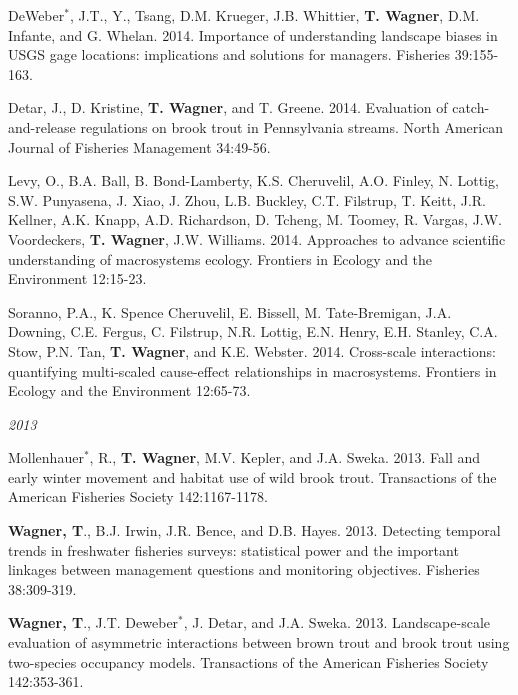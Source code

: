 \documentclass[10pt]{article}
\begin{document}
\begin{flushleft}
\begin{etaremune}[start=41]
\item DeWeber$^*$, J.T., Y., Tsang, D.M. Krueger, J.B. Whittier, {\bf T. Wagner}, D.M. Infante, and G. Whelan. 2014. Importance of understanding landscape biases in USGS gage locations: implications and solutions for managers. Fisheries 39:155-163. 

\item Detar, J., D. Kristine, {\bf T. Wagner}, and T. Greene. 2014. Evaluation of catch-and-release regulations on brook trout in Pennsylvania streams. North American Journal of Fisheries Management 34:49-56.

\item Levy, O., B.A. Ball, B. Bond-Lamberty, K.S. Cheruvelil,  A.O. Finley, N. Lottig, S.W. Punyasena, J. Xiao, J. Zhou, L.B. Buckley, C.T. Filstrup, T. Keitt, J.R. Kellner, A.K. Knapp, A.D. Richardson, D. Tcheng, M. Toomey, R. Vargas, J.W. Voordeckers, {\bf T.  Wagner}, J.W. Williams. 2014. Approaches to advance scientific understanding of macrosystems ecology. Frontiers in Ecology and the Environment 12:15-23. 

\item Soranno, P.A., K. Spence Cheruvelil, E. Bissell, M. Tate-Bremigan, J.A. Downing, C.E. Fergus, C. Filstrup, N.R. Lottig, E.N. Henry, E.H. Stanley, C.A. Stow, P.N. Tan, {\bf T. Wagner}, and K.E. Webster. 2014. Cross-scale interactions: quantifying multi-scaled cause-effect relationships in macrosystems. Frontiers in Ecology and the Environment 12:65-73. 

\end{etaremune}
\emph{2013}
\begin{etaremune}[start=28]
\item Mollenhauer$^*$, R., {\bf T. Wagner}, M.V. Kepler, and J.A. Sweka. 2013. Fall and early winter movement and habitat use of wild brook trout. Transactions of the American Fisheries Society 142:1167-1178.

\item {\bf Wagner, T}., B.J. Irwin, J.R. Bence, and D.B. Hayes. 2013. Detecting temporal trends in freshwater fisheries surveys: statistical power and the important linkages between management questions and monitoring objectives. Fisheries 38:309-319.

\item {\bf Wagner, T}., J.T. Deweber$^*$, J. Detar, and J.A. Sweka. 2013. Landscape-scale evaluation of asymmetric interactions between brown trout and brook trout using two-species occupancy models. Transactions of the American Fisheries Society 142:353-361.


\end{etaremune}
\end{flushleft}
\end{document}
